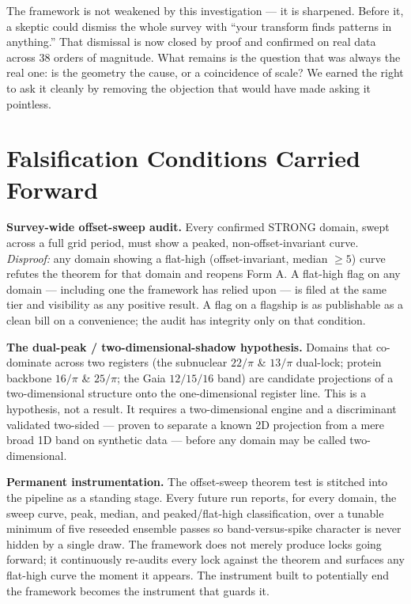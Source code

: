 \documentclass[11pt, letterpaper, openany]{book}
\begin{document}
\begin{newworld}{The framework is not weakened by this investigation --- it is sharpened.
Before it, a skeptic could dismiss the whole survey with ``your transform finds patterns in
anything.'' That dismissal is now closed by proof and confirmed on real data across $38$
orders of magnitude. What remains is the question that was always the real one: is the
geometry the cause, or a coincidence of scale? We earned the right to ask it cleanly by
removing the objection that would have made asking it pointless.}
 
\section{Falsification Conditions Carried Forward}
 
\begin{predictionbox}
\textbf{Survey-wide offset-sweep audit.} Every confirmed STRONG domain, swept across a full
grid period, must show a peaked, non-offset-invariant curve. \emph{Disproof:} any domain
showing a flat-high (offset-invariant, median $\geq 5$) curve refutes the theorem for that
domain and reopens Form A. A flat-high flag on any domain --- including one the framework has
relied upon --- is filed at the same tier and visibility as any positive result. A flag on a
flagship is as publishable as a clean bill on a convenience; the audit has integrity only on
that condition.
\end{predictionbox}
 
\begin{predictionbox}
\textbf{The dual-peak / two-dimensional-shadow hypothesis.} Domains that co-dominate across
two registers (the subnuclear $22/\pi$ \& $13/\pi$ dual-lock; protein backbone $16/\pi$ \&
$25/\pi$; the Gaia $12/15/16$ band) are candidate projections of a two-dimensional structure
onto the one-dimensional register line. This is a hypothesis, not a result. It requires a
two-dimensional engine and a discriminant validated two-sided --- proven to separate a known
2D projection from a mere broad 1D band on synthetic data --- before any domain may be called
two-dimensional.
\end{predictionbox}
 
\begin{predictionbox}
\textbf{Permanent instrumentation.} The offset-sweep theorem test is stitched into the
pipeline as a standing stage. Every future run reports, for every domain, the sweep curve,
peak, median, and peaked/flat-high classification, over a tunable minimum of five reseeded
ensemble passes so band-versus-spike character is never hidden by a single draw. The
framework does not merely produce locks going forward; it continuously re-audits every lock
against the theorem and surfaces any flat-high curve the moment it appears. The instrument
built to potentially end the framework becomes the instrument that guards it.
\end{predictionbox}
 

\end{newworld}
\end{document}
